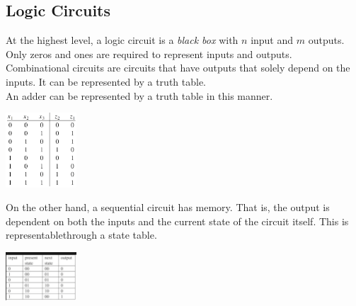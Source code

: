 \documentclass[nobib]{tufte-handout}
\begin{document}
\subsection{Logic Circuits}
At the highest level, a logic circuit is a \textit{black box} with $n$ input and $m$ outputs.
Only zeros and ones are required to represent inputs and outputs. \\
Combinational circuits are circuits that have outputs that solely depend on the inputs. It can be represented by a truth table.\\
An adder can be represented by a truth table in this manner.
\begin{center}
    \includegraphics[width= 100px]{images/Screenshot 2024-01-10 144557.png}
\end{center}
On the other hand, a sequential circuit has memory. That is, the output is dependent on both the inputs and the current state of the circuit itself. This is representablethrough a state table.\\
\begin{center}
    \includegraphics[width= 100px]{images/state table.png}
\end{center}
\end{document}
